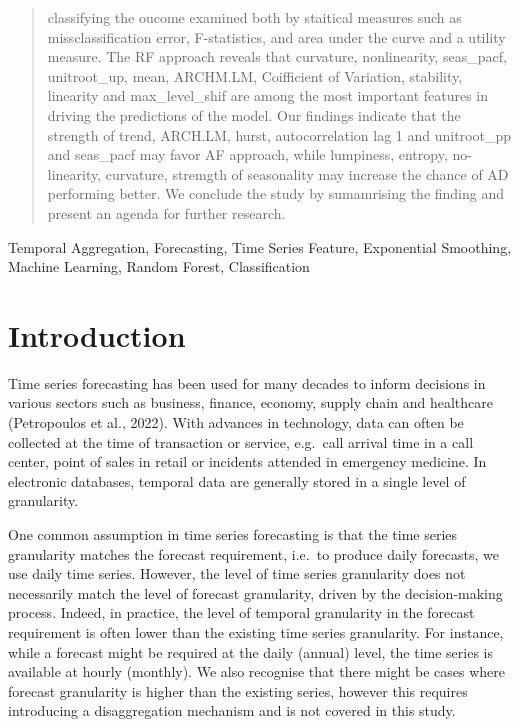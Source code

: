 \documentclass[]{elsarticle} %
\begin{document}
\begin{frontmatter}
\begin{abstract}
  classifying the oucome examined both by staitical measures such as
  missclassification error, F-statistics, and area under the curve and a
  utility measure. The RF approach reveals that curvature, nonlinearity,
  seas\_pacf, unitroot\_up, mean, ARCHM.LM, Coifficient of Variation,
  stability, linearity and max\_level\_shif are among the most important
  features in driving the predictions of the model. Our findings indicate
  that the strength of trend, ARCH.LM, hurst, autocorrelation lag 1 and
  unitroot\_pp and seas\_pacf may favor AF approach, while lumpiness,
  entropy, no-linearity, curvature, stremgth of seasonality may increase
  the chance of AD performing better. We conclude the study by sumamrising
  the finding and present an agenda for further research.
  \end{abstract}
   \begin{keyword} Temporal Aggregation, Forecasting, Time Series Feature, Exponential
Smoothing, Machine Learning, Random Forest, Classification\end{keyword}
 \end{frontmatter}

\hypertarget{introduction}{%
\section{Introduction}\label{introduction}}

Time series forecasting has been used for many decades to inform
decisions in various sectors such as business, finance, economy, supply
chain and healthcare (Petropoulos et al., 2022). With advances in
technology, data can often be collected at the time of transaction or
service, e.g.~call arrival time in a call center, point of sales in
retail or incidents attended in emergency medicine. In electronic
databases, temporal data are generally stored in a single level of
granularity.

One common assumption in time series forecasting is that the time series
granularity matches the forecast requirement, i.e.~to produce daily
forecasts, we use daily time series. However, the level of time series
granularity does not necessarily match the level of forecast
granularity, driven by the decision-making process. Indeed, in practice,
the level of temporal granularity in the forecast requirement is often
lower than the existing time series granularity. For instance, while a
forecast might be required at the daily (annual) level, the time series
is available at hourly (monthly). We also recognise that there might be
cases where forecast granularity is higher than the existing series,
however this requires introducing a disaggregation mechanism and is not
covered in this study.
\end{document}
